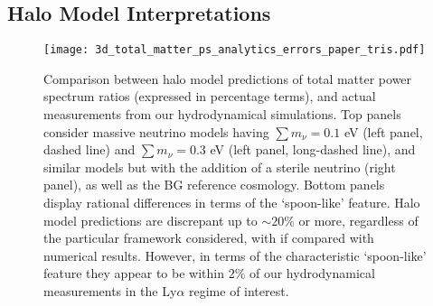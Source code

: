\documentclass{emulateapj}
\begin{document}

\subsection{Halo Model Interpretations}


\begin{figure}
\centering
\texttt{[image: 3d\_total\_matter\_ps\_analytics\_errors\_paper\_tris.pdf]}
\caption{Comparison between halo model predictions of total matter power spectrum ratios (expressed in percentage terms), and actual measurements from our hydrodynamical simulations.
Top panels consider 
 massive neutrino models
having $\sum m_{\nu} = 0.1$ eV (left panel, dashed line) and $\sum m_{\nu} = 0.3$ eV (left panel, long-dashed line), and similar models but with the addition of a sterile neutrino (right panel), 
as well as the BG reference cosmology. 
Bottom panels display rational differences in terms of the `spoon-like' feature.  Halo model predictions are discrepant up to $\sim 20\%$ or more, regardless of the particular framework considered, with
if compared with numerical results. However,  in terms of the characteristic `spoon-like' feature they  
appear to be within $2 \%$ of our hydrodynamical measurements in the Ly$\alpha$
regime of interest.}
\label{fig_halo_model_comparisons_1}
\end{figure}
\end{document}
